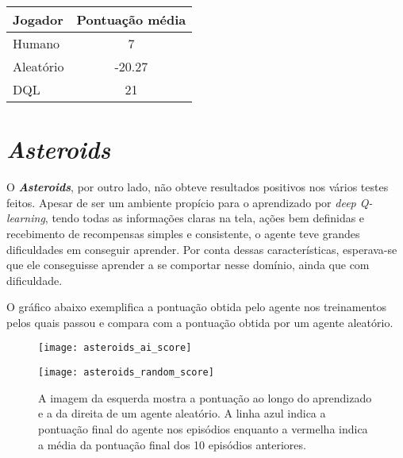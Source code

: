\begin{center}
\begin{tabular}{l c}
\hline
Jogador & Pontuação média \\
\hline
Humano & 7 \\
Aleatório & -20.27 \\
DQL & 21 \\
\hline
\end{tabular}
\label{table:pong_score}
\end{center}


\section{\textit{Asteroids}}
\label{sec:res_asteroids}
O \textbf{\textit{Asteroids}}, por outro lado, não obteve resultados positivos nos vários testes feitos.
Apesar de ser um ambiente propício para o aprendizado por \textit{deep Q-learning}, tendo todas as informações claras na tela, ações bem definidas e recebimento de recompensas simples e consistente, o agente teve grandes dificuldades em conseguir aprender.
Por conta dessas características, esperava-se que ele conseguisse aprender a se comportar nesse domínio, ainda que com dificuldade.

O gráfico abaixo exemplifica a pontuação obtida pelo agente nos treinamentos pelos quais passou e compara com a pontuação obtida por um agente aleatório.

\begin{figure}[h!]
  \begin{minipage}[b]{.5\textwidth}
  \centering
  \texttt{[image: asteroids\_ai\_score]}
  \end{minipage}
  \hfill
  \begin{minipage}[b]{.5\textwidth}
  \centering
  \texttt{[image: asteroids\_random\_score]}
  \end{minipage}
  \caption{A imagem da esquerda mostra a pontuação ao longo do aprendizado e a da direita de um agente aleatório. A linha azul indica a pontuação final do agente nos episódios enquanto a vermelha indica a média da pontuação final dos 10 episódios anteriores.}
  \label{fig:asteroids_score}
\end{figure}

